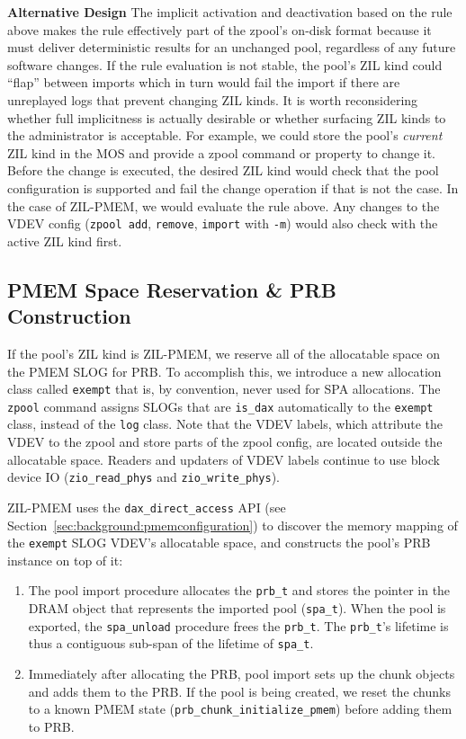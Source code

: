 \documentclass[12pt,a4paper,twoside]{book}
\begin{document}
{\textbf{Alternative Design}
The implicit activation and deactivation based on the rule above makes the rule effectively part of the zpool's on-disk format because it must deliver deterministic results for an unchanged pool, regardless of any future software changes.
If the rule evaluation is not stable, the pool's ZIL kind could ``flap'' between imports which in turn would fail the import if there are unreplayed logs that prevent changing ZIL kinds.
It is worth reconsidering whether full implicitness is actually desirable or whether surfacing ZIL kinds to the administrator is acceptable.
For example, we could store the pool's \textit{current} ZIL kind in the MOS and provide a zpool command or property to change it.
Before the change is executed, the desired ZIL kind would check that the pool configuration is supported and fail the change operation if that is not the case.
In the case of ZIL-PMEM, we would evaluate the rule above.
Any changes to the VDEV config (\lstinline{zpool add}, \lstinline{remove}, \lstinline{import} with \lstinline{-m}) would also check with the active ZIL kind first.

\subsection{PMEM Space Reservation \& PRB Construction}\label{sec:zilpmemzilkind:spacereservation}

If the pool's ZIL kind is ZIL-PMEM, we reserve all of the allocatable space on the PMEM SLOG for PRB.
To accomplish this, we introduce a new allocation class called \lstinline{exempt} that is, by convention, never used for SPA allocations.
The \lstinline{zpool} command assigns SLOGs that are \lstinline{is_dax} automatically to the \lstinline{exempt} class, instead of the \lstinline{log} class.
Note that the VDEV labels, which attribute the VDEV to the zpool and store parts of the zpool config, are located outside the allocatable space.
Readers and updaters of VDEV labels continue to use block device IO (\lstinline{zio_read_phys} and \lstinline{zio_write_phys}).

ZIL-PMEM uses the \lstinline{dax_direct_access} API (see Section~\ref{sec:background:pmemconfiguration}) to discover the memory mapping of the \lstinline{exempt} SLOG VDEV's allocatable space, and constructs the pool's PRB instance on top of it:
\begin{enumerate}
\item The pool import procedure allocates the \lstinline{prb_t} and stores the pointer in the DRAM object that represents the imported pool (\lstinline{spa_t}).
When the pool is exported, the \lstinline{spa_unload} procedure frees the \lstinline{prb_t}.
The \lstinline{prb_t}'s lifetime is thus a contiguous sub-span of the lifetime of \lstinline{spa_t}.
\item  Immediately after allocating the PRB, pool import sets up the chunk objects and adds them to the PRB.
If the pool is being created, we reset the chunks to a known PMEM state (\lstinline{prb_chunk_initialize_pmem}) before adding them to PRB.
\end{enumerate}

}
\end{document}
